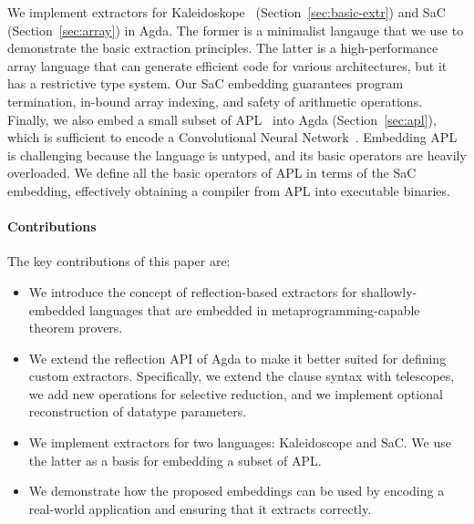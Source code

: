 \documentclass[acmsmall,review,anonymous]{acmart}\settopmatter{printfolios=true,printccs=false,printacmref=false}
\begin{document}
We implement extractors for Kaleidoskope~\cite{kaleidoscope} (Section~\ref{sec:basic-extr})
and SaC~\cite{sac} (Section~\ref{sec:array}) in Agda.
The former is a minimalist langauge that we use to demonstrate the basic
extraction principles.  The latter is a high-performance
array language that can generate efficient code for various architectures, but
it has a restrictive type system.  Our SaC embedding guarantees
program termination, in-bound array indexing, and safety of arithmetic operations.
%
Finally, we also embed a small subset of APL~\cite{} into Agda (Section~\ref{sec:apl}), which
is sufficient to encode a Convolutional Neural
Network~\cite{cnninapl}.  Embedding APL is challenging because the
language is untyped, and its basic operators are heavily overloaded.
We define all the basic operators of APL in terms of the SaC embedding,
effectively obtaining a compiler from APL into executable binaries.

\paragraph{Contributions}
The key contributions of this paper are:
\begin{itemize}
    \item We introduce the concept of reflection-based extractors
            for shallowly-embedded languages that are embedded
            in metaprogramming-capable theorem provers.
    \item We extend the reflection API of
            Agda to make it better suited for defining
            custom extractors. Specifically, we extend the clause
            syntax with telescopes, we add new operations for
            selective reduction, and we implement optional reconstruction
            of datatype parameters.
    \item We implement extractors for two languages: Kaleidoscope
            and SaC.  We use the latter as a basis for embedding
            a subset of APL.
    \item We demonstrate how the proposed embeddings can be used
            by encoding a real-world application and ensuring that
            it extracts correctly.
\end{itemize}

\end{document}
